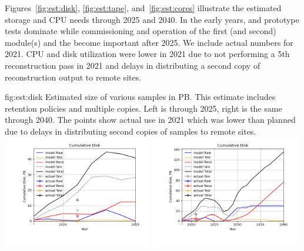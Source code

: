 \documentclass[../main-v1.tex]{subfiles}
\begin{document}
Figures~\ref{fig:est:disk}, \ref{fig:est:tape}, and~\ref{fig:est:cores} illustrate the estimated storage and CPU needs through 2025 and 2040.  In the early years,  and  prototype tests dominate while commissioning and operation of the first (and second)  module(s) and the  become important after 2025. We include actual numbers for 2021. CPU and disk utilization were lower in 2021 due to not performing a 5th reconstruction pass in 2021 and delays in distributing a second copy of reconstruction output to remote sites. 

\begin{dunefigure}
{fig:est:disk}
{Estimated size of various samples in PB. This estimate includes retention policies and multiple copies. Left is through 2025, right is the same through 2040. The points show actual use in 2021 which was lower than planned due to delays in distributing second copies of samples to remote sites.}
\includegraphics[width=0.49\textwidth]{graphics/IntroFigures/2025/Parameters_2022-03-04-2025-Cumulative-Disk.png}
\includegraphics[width=0.49\textwidth]{graphics/IntroFigures/2040/Parameters_2022-03-04-2040-Cumulative-Disk.png}
\end{dunefigure}
\end{document}

